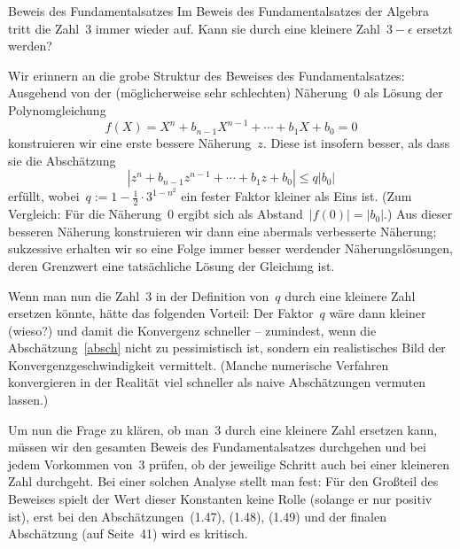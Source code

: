 \documentclass{algblatt}
\begin{document}
\begin{aufgabe}{Beweis des Fundamentalsatzes}
Im Beweis des Fundamentalsatzes der Algebra tritt die Zahl~3 immer wieder auf.
Kann sie durch eine kleinere Zahl~$3-\epsilon$ ersetzt werden?
\begin{loesung}
Wir erinnern an die grobe Struktur des Beweises des Fundamentalsatzes:
Ausgehend von der (möglicherweise sehr schlechten) Näherung~$0$ als Lösung der
Polynomgleichung
\[ f(X) = X^n + b_{n-1}X^{n-1} + \cdots + b_1 X + b_0 = 0 \]
konstruieren wir eine erste bessere Näherung~$z$. Diese ist insofern besser,
als dass sie die Abschätzung
\begin{equation}\label{absch}
  |z^n + b_{n-1}z^{n-1} + \cdots + b_1 z + b_0| \leq q |b_0|
\end{equation}
erfüllt, wobei~$q := 1 - \frac{1}{2} \cdot 3^{1 - n^2}$ ein fester Faktor
kleiner als Eins ist. (Zum Vergleich: Für die Näherung~$0$ ergibt sich als
Abstand~$|f(0)| = |b_0|$.) Aus dieser besseren Näherung konstruieren wir dann
eine abermals verbesserte Näherung; sukzessive erhalten wir so eine Folge immer
besser werdender Näherungslösungen, deren Grenzwert eine tatsächliche Lösung
der Gleichung ist.

Wenn man nun die Zahl~$3$ in der Definition von~$q$ durch eine kleinere Zahl
ersetzen könnte, hätte das folgenden Vorteil: Der Faktor~$q$ wäre dann kleiner
(wieso?) und damit die Konvergenz schneller -- zumindest, wenn die
Abschätzung~\eqref{absch} nicht zu pessimistisch ist, sondern ein realistisches
Bild der Konvergenzgeschwindigkeit vermittelt. (Manche numerische Verfahren
konvergieren in der Realität viel schneller als naive Abschätzungen vermuten
lassen.)

Um nun die Frage zu klären, ob man~$3$ durch eine kleinere Zahl ersetzen kann,
müssen wir den gesamten Beweis des Fundamentalsatzes durchgehen und bei jedem
Vorkommen von~$3$ prüfen, ob der jeweilige Schritt auch bei einer kleineren
Zahl durchgeht. Bei einer solchen Analyse stellt man fest: Für den Großteil des
Beweises spielt der Wert dieser Konstanten keine Rolle (solange er nur positiv
ist), erst bei den Abschätzungen~(1.47), (1.48), (1.49) und der finalen
Abschätzung (auf Seite~41) wird es kritisch.


\end{loesung}
\end{aufgabe}
\end{document}
